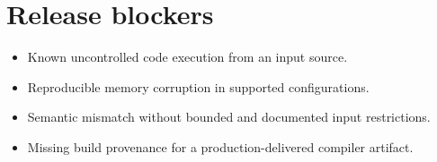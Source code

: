 \documentclass[10pt,letterpaper]{article}
\begin{document}
\section{Release blockers}
\begin{itemize}
\item Known uncontrolled code execution from an input source.
\item Reproducible memory corruption in supported configurations.
\item Semantic mismatch without bounded and documented input restrictions.
\item Missing build provenance for a production-delivered compiler artifact.
\end{itemize}
\end{document}
